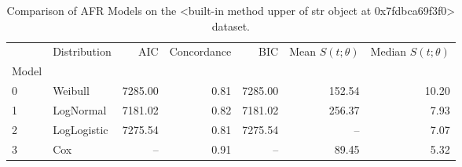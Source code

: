 \begin{table}
\caption{Comparison of AFR Models on the <built-in method upper of str object at 0x7fdbca69f3f0> dataset.}
\label{tab:mnist}
\begin{tabular}{llrrrrr}
\toprule
 & Distribution & AIC & Concordance & BIC & Mean $S(t;\theta)$ & Median $S(t;\theta)$ \\
Model &  &  &  &  &  &  \\
\midrule
0 & Weibull & 7285.00 & 0.81 & 7285.00 & 152.54 & 10.20 \\
1 & LogNormal & 7181.02 & 0.82 & 7181.02 & 256.37 & 7.93 \\
2 & LogLogistic & 7275.54 & 0.81 & 7275.54 & -- & 7.07 \\
3 & Cox & -- & 0.91 & -- & 89.45 & 5.32 \\
\bottomrule
\end{tabular}
\end{table}
